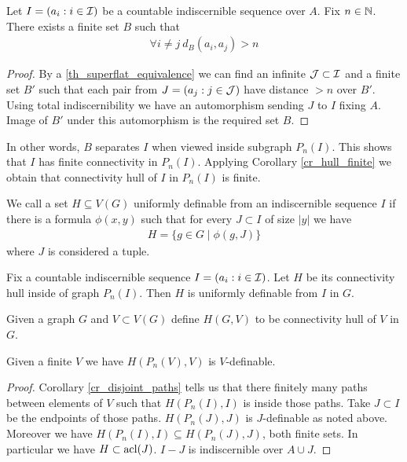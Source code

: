 \begin{Lemma} \label{lm_bump}
	Let $I = (a_i : i \in \operatorname{\mathcal I})$ be a countable indiscernible sequence over $A$. Fix $n \in \mathbb{N}$.
	There exists a finite set $B$ such that
	\begin{align*}
		\forall i \neq j \ d_B(a_i, a_j) > n
	\end{align*}
\end{Lemma}

\begin{proof}
	By a \ref{th_superflat_equivalence} we can find an infinite $\operatorname{\mathcal J} \subset \operatorname{\mathcal I}$ and a finite set $B'$ such that each pair from $J = (a_j : j \in \operatorname{\mathcal J})$ have distance $>n$ over $B'$.
	Using total indiscernibility we have an automorphism sending $J$ to $I$ fixing $A$.
	Image of $B'$ under this automorphism is the required set $B$.
\end{proof}

In other words, $B$ separates $I$ when viewed inside subgraph $P_n(I)$.
This shows that $I$ has finite connectivity in $P_n(I)$.
Applying Corollary \ref{cr_hull_finite} we obtain that connectivity hull of $I$ in $P_n(I)$ is finite.

\begin{Definition}
	We call a set $H \subseteq V(G)$ uniformly definable from an indiscernible sequence $I$ if there is a formula $\phi(x, y)$ such that for every $J \subset I$ of size $|y|$ we have
	\begin{align*}
		H = \{g \in G \mid \phi(g, J)\}
	\end{align*}
	where $J$ is considered a tuple.
\end{Definition}

\begin{Lemma} \label{lm_uniform}
	Fix a countable indiscernible sequence $I = (a_i : i \in \operatorname{\mathcal I})$.
	Let $H$ be its connectivity hull inside of graph $P_n(I)$.
	Then $H$ is uniformly definable from $I$ in $G$.
\end{Lemma}

\begin{Definition}
	Given a graph $G$ and $V \subset V(G)$ define $H(G, V)$ to be connectivity hull of $V$ in $G$.
\end{Definition}

\begin{Note}
	Given a finite $V$ we have $H(P_n(V), V)$ is $V$-definable.
\end{Note}

\begin{proof}
	Corollary \ref{cr_disjoint_paths} tells us that there finitely many paths between elements of $V$ such that $H(P_n(I), I)$ is inside those paths.
	Take $J \subset I$ be the endpoints of those paths.
	$H(P_n(J), J)$ is $J$-definable as noted above.
	Moreover we have $H(P_n(I), I) \subseteq H(P_n(J), J)$, both finite sets.
	In particular we have $H \subset \operatorname{acl}(J)$.
	$I-J$ is indiscernible over $A \cup J$.
	
\end{proof}

